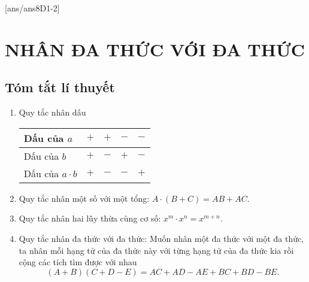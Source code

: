 [ans/ans8D1-2]
\section{NHÂN ĐA THỨC VỚI ĐA THỨC}
\subsection{Tóm tắt lí thuyết}
\begin{enumerate}[\tickEX]
	\item Quy tắc nhân dấu
		\begin{center}
			\begin{tabular}{|l|c|c|c|c|}
				\hline 
				Dấu của $a$ & $+$ & $+$ & $-$ & $-$ \\ 
				\hline 
				Dấu của $b$ & $+$ & $-$ & $+$ & $-$ \\ 
				\hline 
				Dấu của $a \cdot b$ &$+$ & $-$ & $-$ & $+$ \\ 
				\hline 
			\end{tabular}
		\end{center}
	\item Quy tắc nhân một số với một tổng: $A\cdot(B+C)=AB+AC.$
	\item Quy tắc nhân hai lũy thừa cùng cơ số: $x^m\cdot x^n=x^{m+n}.$
	\item Quy tắc nhân đa thức với đa thức: Muốn nhân một đa thức với một đa thức, ta nhân mỗi hạng tử của đa thức này với từng hạng tử của đa thức kia rồi cộng các tích tìm được với nhau \[(A+B)(C+D-E)=AC+AD-AE+BC+BD-BE.\]
\end{enumerate}
